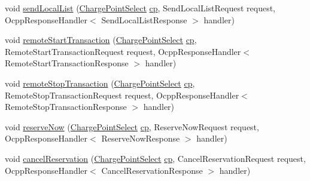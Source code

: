 \begin{DoxyCompactItemize}
void \hyperlink{classde_1_1rwth_1_1idsg_1_1steve_1_1ocpp_1_1soap_1_1_charge_point_service15___soap_invoker_af9ff2655ec703253c6f3cfe632c51d95}{send\-Local\-List} (\hyperlink{classde_1_1rwth_1_1idsg_1_1steve_1_1repository_1_1dto_1_1_charge_point_select}{Charge\-Point\-Select} \hyperlink{get_transaction_ids_8js_a02fb69feb56940fd46d72ea6a60e511f}{cp}, Send\-Local\-List\-Request request, Ocpp\-Response\-Handler$<$ Send\-Local\-List\-Response $>$ handler)
\item 
void \hyperlink{classde_1_1rwth_1_1idsg_1_1steve_1_1ocpp_1_1soap_1_1_charge_point_service15___soap_invoker_a4f30d3d25a5c89d5a9303c055f1449f7}{remote\-Start\-Transaction} (\hyperlink{classde_1_1rwth_1_1idsg_1_1steve_1_1repository_1_1dto_1_1_charge_point_select}{Charge\-Point\-Select} \hyperlink{get_transaction_ids_8js_a02fb69feb56940fd46d72ea6a60e511f}{cp}, Remote\-Start\-Transaction\-Request request, Ocpp\-Response\-Handler$<$ Remote\-Start\-Transaction\-Response $>$ handler)
\item 
void \hyperlink{classde_1_1rwth_1_1idsg_1_1steve_1_1ocpp_1_1soap_1_1_charge_point_service15___soap_invoker_a8d6b588fb8f2c3bf21daebb80913c15c}{remote\-Stop\-Transaction} (\hyperlink{classde_1_1rwth_1_1idsg_1_1steve_1_1repository_1_1dto_1_1_charge_point_select}{Charge\-Point\-Select} \hyperlink{get_transaction_ids_8js_a02fb69feb56940fd46d72ea6a60e511f}{cp}, Remote\-Stop\-Transaction\-Request request, Ocpp\-Response\-Handler$<$ Remote\-Stop\-Transaction\-Response $>$ handler)
\item 
void \hyperlink{classde_1_1rwth_1_1idsg_1_1steve_1_1ocpp_1_1soap_1_1_charge_point_service15___soap_invoker_a83963dacc9043e8c184b72efd59c87f5}{reserve\-Now} (\hyperlink{classde_1_1rwth_1_1idsg_1_1steve_1_1repository_1_1dto_1_1_charge_point_select}{Charge\-Point\-Select} \hyperlink{get_transaction_ids_8js_a02fb69feb56940fd46d72ea6a60e511f}{cp}, Reserve\-Now\-Request request, Ocpp\-Response\-Handler$<$ Reserve\-Now\-Response $>$ handler)
\item 
void \hyperlink{classde_1_1rwth_1_1idsg_1_1steve_1_1ocpp_1_1soap_1_1_charge_point_service15___soap_invoker_abea544028d13891f5f5d369ad04bb87d}{cancel\-Reservation} (\hyperlink{classde_1_1rwth_1_1idsg_1_1steve_1_1repository_1_1dto_1_1_charge_point_select}{Charge\-Point\-Select} \hyperlink{get_transaction_ids_8js_a02fb69feb56940fd46d72ea6a60e511f}{cp}, Cancel\-Reservation\-Request request, Ocpp\-Response\-Handler$<$ Cancel\-Reservation\-Response $>$ handler)
\end{DoxyCompactItemize}


